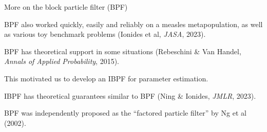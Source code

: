 \documentclass{beamer}
\begin{document}
\begin{frame}{More on the block particle filter (BPF)}

\bi
\item BPF also worked quickly, easily and reliably on a measles metapopulation, as well as various toy benchmark problems (Ionides et al, {\it JASA}, 2023).

        \vspace{2mm}

\item BPF has theoretical support in some situations (Rebeschini \& Van Handel, {\it Annals of Applied Probability}, 2015).

        \vspace{2mm}

      \item This motivated us to develop an IBPF for parameter estimation.
        
        \vspace{2mm}

      \item IBPF has theoretical guarantees similar to BPF (Ning \& Ionides, {\it JMLR}, 2023).
        
        \vspace{2mm}

        
\item BPF was independently proposed as the ``factored particle filter'' by Ng et al (2002).

\ei

\end{frame}
\end{document}
